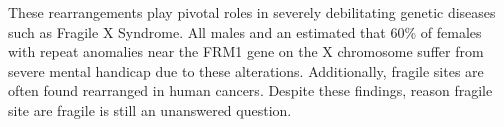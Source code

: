 \documentclass[phd,tocprelim]{cornell}
\begin{document}
These
rearrangements play pivotal roles in severely debilitating genetic diseases
such as Fragile X Syndrome.  All males and an estimated that 60\% of females
with repeat anomalies near the FRM1 gene on the X chromosome suffer
from severe mental handicap due to these alterations\cite{sutherland1995}.
Additionally, fragile sites are often found rearranged in human
cancers\cite{glover2005}.  Despite these findings, reason fragile site are
fragile is still an unanswered question.








%
%

\appendix
\appendixpage
\addappheadtotoc



%
%



%
%

{}

\printglossaries
\end{document}
